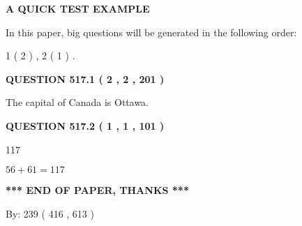 \documentclass[12pt]{article}
\begin{document}
   
   
   
   
   
 \vspace{0.2in}
{\LARGE {\textbf{ A QUICK TEST EXAMPLE}}}
   
   
   
\vspace{0.2in}
   
In this paper, big questions will be generated in the following order: 
   
   
   1 ( 2 )
 ,
   2 ( 1 )
 .
  
\vspace{0.2in}
  
{\textbf{\Large{QUESTION
517.1 
 ( 2 , 2 , 201 )
}}}
  
  
 
 
\noindent{}
 
 
The capital of Canada is Ottawa.
 
 
 
 
  
\vspace{0.2in}
  
{\textbf{\Large{QUESTION
517.2 
 ( 1 , 1 , 101 )
}}}
  
  
 
 
\noindent{}

117
 
 
 
 
\noindent{}

$ %
56 +  %
61=   %
117$
 
 
   
   
 \vspace{0.2in}
 
   
   
   
   
\vspace{1.0in} 
{\textbf{\large{ *** END OF PAPER, THANKS *** }}} 
   
   
\hspace{1.0in} By: 
 239 ( 416 ,  613 )
   
   
   
   
\newpage 
\setcounter{page}{ 
   518001 } 
   
\end{document}

